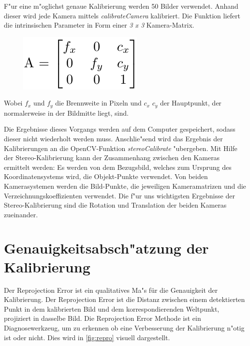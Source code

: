 \noindent F"ur eine m"oglichst genaue Kalibrierung werden 50 Bilder verwendet. Anhand dieser wird jede Kamera mittels \textit{calibrateCamera} kalibriert.\newline
Die Funktion liefert die intrinsischen Parameter in Form einer \textit{3 x 3} Kamera-Matrix.

\begin{figure}[H]
	\centering
	\includegraphics[scale=0.75]{bilder/matrix}
\end{figure}

\noindent Wobei $f_{x}$ und $f_{y}$ die Brennweite in Pixeln und $c_{x}$ $c_{y}$ der Hauptpunkt, der normalerweise in der Bildmitte liegt, sind.

\noindent Die Ergebnisse dieses Vorgangs werden auf dem Computer gespeichert, sodass dieser nicht wiederholt werden muss. Anschlie"send wird das Ergebnis der Kalibrierungen an die OpenCV-Funktion \textit{stereoCalibrate} "ubergeben.\newline
Mit Hilfe der Stereo-Kalibrierung kann der Zusammenhang zwischen den Kameras ermittelt werden: Es werden von dem Bezugsbild, welches zum Ursprung des Koordinatensystems wird, die Objekt-Punkte verwendet. Von beiden Kamerasystemen werden die Bild-Punkte, die jeweiligen Kameramatrizen und die Verzeichnungskoeffizienten verwendet. Die f"ur uns wichtigsten Ergebnisse der Stereo-Kalibrierung sind die Rotation und Translation der beiden Kameras zueinander.

\section{Genauigkeitsabsch"atzung der Kalibrierung}
\label{sec:fehlertest}

Der Reprojection Error ist ein qualitatives Ma"s für die Genauigkeit der Kalibrierung. Der Reprojection Error ist die Distanz zwischen einem detektierten Punkt in dem kalibrierten Bild und dem korrespondierenden Weltpunkt, projiziert in dasselbe Bild. Die Reprojection Error Methode ist ein Diagnosewerkzeug, um zu erkennen ob eine Verbesserung der Kalibrierung n"otig ist oder nicht. Dies wird in \ref{fig:repro} visuell dargestellt.


